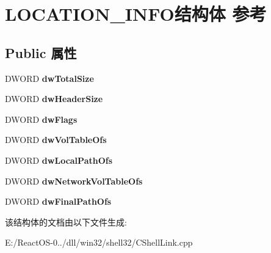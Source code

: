 \hypertarget{struct_l_o_c_a_t_i_o_n___i_n_f_o}{}\section{L\+O\+C\+A\+T\+I\+O\+N\+\_\+\+I\+N\+F\+O结构体 参考}
\label{struct_l_o_c_a_t_i_o_n___i_n_f_o}
\subsection*{Public 属性}
\begin{DoxyCompactItemize}
\item 
\mbox{\label{struct_l_o_c_a_t_i_o_n___i_n_f_o_a7b4971dd94b724766a660a33d2e0f02a}} 
D\+W\+O\+RD {\bfseries dw\+Total\+Size}
\item 
\mbox{\label{struct_l_o_c_a_t_i_o_n___i_n_f_o_a5c1b5a787d536d9cc465e49ccedc7dfb}} 
D\+W\+O\+RD {\bfseries dw\+Header\+Size}
\item 
\mbox{\label{struct_l_o_c_a_t_i_o_n___i_n_f_o_aba3ece5ad79548badea1c58e78960145}} 
D\+W\+O\+RD {\bfseries dw\+Flags}
\item 
\mbox{\label{struct_l_o_c_a_t_i_o_n___i_n_f_o_a5ecd53ad60ecd7d6fa044b79789591b5}} 
D\+W\+O\+RD {\bfseries dw\+Vol\+Table\+Ofs}
\item 
\mbox{\label{struct_l_o_c_a_t_i_o_n___i_n_f_o_a54d69ef4bebe3802569387fabd747fe8}} 
D\+W\+O\+RD {\bfseries dw\+Local\+Path\+Ofs}
\item 
\mbox{\label{struct_l_o_c_a_t_i_o_n___i_n_f_o_abaab6f517f7c83b864554c46689a0709}} 
D\+W\+O\+RD {\bfseries dw\+Network\+Vol\+Table\+Ofs}
\item 
\mbox{\label{struct_l_o_c_a_t_i_o_n___i_n_f_o_a84e09f6e111176b598574425172024c3}} 
D\+W\+O\+RD {\bfseries dw\+Final\+Path\+Ofs}
\end{DoxyCompactItemize}


该结构体的文档由以下文件生成\+:\begin{DoxyCompactItemize}
\item 
E\+:/\+React\+O\+S-\/0../dll/win32/shell32/C\+Shell\+Link.\+cpp\end{DoxyCompactItemize}
